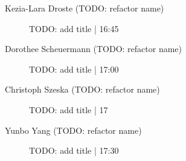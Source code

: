 \begin{symposium}
\begin{description}
                \item [Kezia-Lara Droste (TODO: refactor name)] TODO: add title \textcolor{mygray}{ | 16:45}    
                
                \item [Dorothee Scheuermann (TODO: refactor name)] TODO: add title \textcolor{mygray}{ | 17:00}    
                
                \item [Christoph Szeska (TODO: refactor name)] TODO: add title \textcolor{mygray}{ | 17}    
                
                \item [Yunbo Yang  (TODO: refactor name)] TODO: add title \textcolor{mygray}{ | 17:30}    
                
            \end{description} 
            \end{symposium}
            